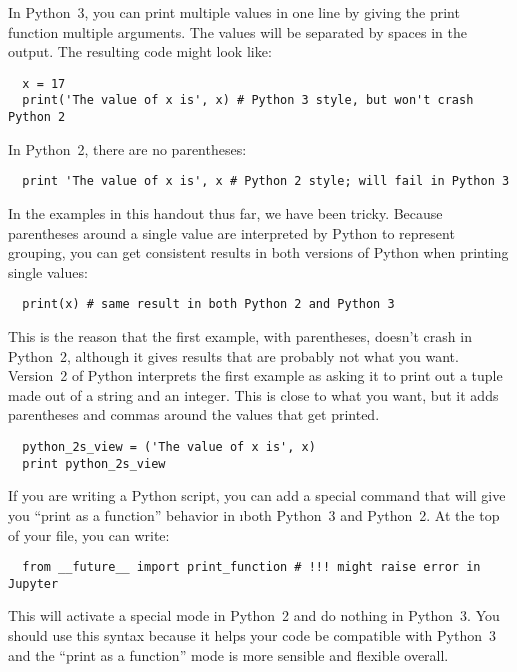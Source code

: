 \documentclass[letterpaper, 12pt, titlepage, twoside]{article}
\begin{document}
In Python~3, you can print multiple values in one line by giving the print
function multiple arguments. The values will be separated by spaces in the
output. The resulting code might look like:

\begin{lstlisting}
  x = 17
  print('The value of x is', x) # Python 3 style, but won't crash Python 2
\end{lstlisting}

In Python~2, there are no parentheses:

\begin{lstlisting}
  print 'The value of x is', x # Python 2 style; will fail in Python 3
\end{lstlisting}

In the examples in this handout thus far, we have been tricky. Because
parentheses around a single value are interpreted by Python to represent
grouping, you can get consistent results in both versions of Python when
printing single values:

\begin{lstlisting}
  print(x) # same result in both Python 2 and Python 3
\end{lstlisting}

This is the reason that the first example, with parentheses, doesn't crash in
Python~2, although it gives results that are probably not what you want.
Version~2 of Python interprets the first example as asking it to print out a
tuple made out of a string and an integer. This is close to what you want, but
it adds parentheses and commas around the values that get printed.

\begin{lstlisting}
  python_2s_view = ('The value of x is', x)
  print python_2s_view
\end{lstlisting}

If you are writing a Python script, you can add a special command that will
give you ``print as a function'' behavior in \i{both} Python~3 and Python~2.
At the top of your file, you can write:

\begin{lstlisting}
  from __future__ import print_function # !!! might raise error in Jupyter
\end{lstlisting}

This will activate a special mode in Python~2 and do nothing in Python~3. You
should use this syntax because it helps your code be compatible with Python~3
and the ``print as a function'' mode is more sensible and flexible overall.
\end{document}
